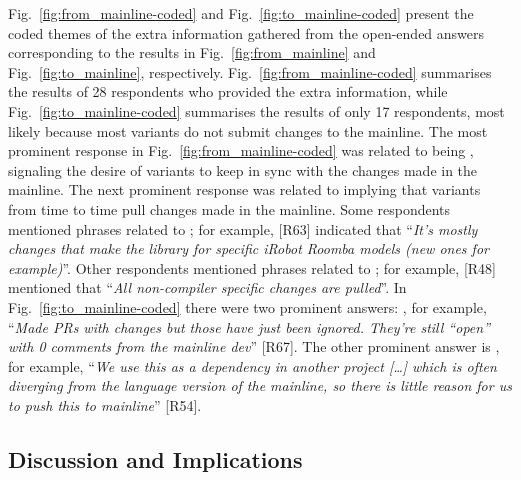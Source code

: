 Fig.~\ref{fig:from_mainline-coded} and Fig.~\ref{fig:to_mainline-coded} present the coded themes of the extra information gathered from the open-ended answers corresponding to the results in Fig.~\ref{fig:from_mainline} and Fig.~\ref{fig:to_mainline}, respectively.
Fig.~\ref{fig:from_mainline-coded} summarises the results of 28 respondents who provided the extra information, while Fig.~\ref{fig:to_mainline-coded} summarises the  results of only 17 respondents, most likely because most variants do not submit changes to the mainline.
The most prominent response in Fig.~\ref{fig:from_mainline-coded} was related to being , signaling the desire of variants to keep in sync with the changes made in the mainline. The next prominent response was related to  implying that variants from time to time pull changes made in the mainline. Some respondents mentioned phrases related to ; for example, [R63] indicated that ``\emph{It's mostly changes that make the library for specific iRobot Roomba models (new ones for example)}''. Other respondents mentioned phrases related to ; for example, [R48] mentioned that ``\emph{All non-compiler specific changes are pulled}''.
In Fig.~\ref{fig:to_mainline-coded} there were two prominent answers: , for example, ``\textit{Made PRs with changes but those have just been ignored. They're still ``open'' with 0 comments from the mainline dev}'' [R67]. The other prominent answer is , for example, ``\emph{We use this as a dependency in another project [\ldots] which is often diverging from the language version of the mainline, so there is little reason for us to push this to mainline}'' [R54]. %

\subsection{Discussion and Implications}

